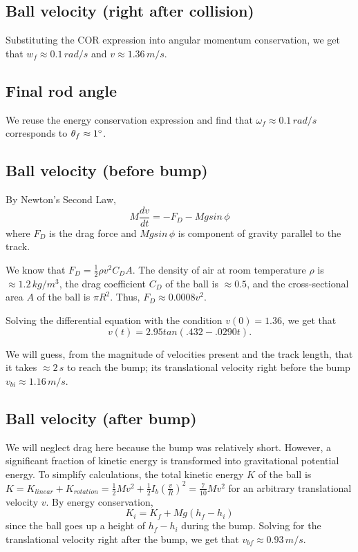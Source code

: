 \documentclass[12pt]{article} %
\begin{document}
\subsection{Ball velocity (right after collision)}

Substituting the COR expression into angular momentum conservation, we get that $w_f \approx 0.1\,rad/s$ and $v \approx 1.36\,m/s$.

\subsection{Final rod angle}

We reuse the energy conservation expression and find that $\omega_f \approx 0.1\,rad/s$ corresponds to $\theta_f \approx 1\degree$.

\subsection{Ball velocity (before bump)}

By Newton's Second Law,
$$M \frac{dv}{dt} = -F_D - Mgsin\,\phi$$
where $F_D$ is the drag force and $Mgsin\,\phi$ is component of gravity parallel to the track.

We know that $F_D = \frac{1}{2}\rho v^2 C_D A$. The density of air at room temperature $\rho$ is $\approx 1.2\,kg/m^3$, the drag coefficient $C_D$ of the ball is $\approx 0.5$, and the cross-sectional area $A$ of the ball is $\pi R^2$.
Thus, $F_D \approx 0.0008v^2$.

Solving the differential equation with the condition $v(0) = 1.36$, we get that $$v(t) = 2.95tan(.432 - .0290t).$$

We will guess, from the magnitude of velocities present and the track length, that it takes $\approx 2\,s$ to reach the bump; its translational velocity right before the bump $v_{bi} \approx 1.16\,m/s$.

\subsection{Ball velocity (after bump)}

We will neglect drag here because the bump was relatively short.
However, a significant fraction of kinetic energy is transformed into gravitational potential energy.
To simplify calculations, the total kinetic energy $K$ of the ball is $K = K_{linear} + K_{rotation} = \frac{1}{2}Mv^2 + \frac{1}{2}I_b(\frac{v}{R})^2 = \frac{7}{10}Mv^2$ for an arbitrary translational velocity $v$.
By energy conservation,
$$K_i = K_f + Mg(h_f - h_i)$$
since the ball goes up a height of $h_f - h_i$ during the bump.
Solving for the translational velocity right after the bump, we get that $v_{bf} \approx 0.93\,m/s$.
\end{document}
